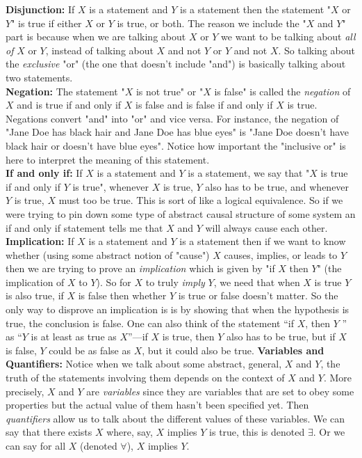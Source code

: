 \documentclass{article}
\theoremstyle{definition}
\theoremstyle{remark}
\begin{document}
\textbf{Disjunction:} If $X$ is a statement and $Y$ is a statement then the statement "$X$ or $Y$" is true if either $X$ or $Y$ is true, or both. The reason we include the "$X$ and $Y$" part is because when we are talking about $X$ or $Y$ we want to be talking about \textit{all of} $X$ or $Y$, instead of talking about $X$ and not $Y$ or $Y$ and not $X$. So talking about the \textit{exclusive} "or" (the one that doesn't include "and") is basically talking about two statements. \\
\textbf{Negation:} The statement "$X$ is not true" or "$X$ is false" is called the \textit{negation} of $X$ and is true if and only if $X$ is false and is false if and only if $X$ is true. Negations convert "and" into "or" and vice versa. For instance, the negation of "Jane Doe has black hair and Jane Doe has blue eyes" is "Jane Doe doesn't have black hair or doesn't have blue eyes". Notice how important the "inclusive or" is here to interpret the meaning of this statement. \\
\textbf{If and only if:} If $X$ is a statement and $Y$ is a statement, we say that "$X$ is true if and only if $Y$ is true", whenever $X$ is true, $Y$ also has to be true, and whenever $Y$ is true, $X$ must too be true. This is sort of like a logical equivalence. So if we were trying to pin down some type of abstract causal structure of some system an if and only if statement tells me that $X$ and $Y$ will always cause each other.\\
\textbf{Implication:} If $X$ is a statement and $Y$ is a statement then if we want to know whether (using some abstract notion of "cause") $X$ causes, implies, or leads to $Y$ then we are trying to prove an \textit{implication} which is given by "if $X$ then $Y$" (the implication of $X$ to $Y$). So for $X$ to truly \textit{imply} $Y$, we need that when $X$ is true $Y$ is also true, if $X$ is false then whether $Y$ is true or false doesn't matter. So the only way to disprove an implication is is by showing that when the hypothesis is true, the conclusion is false. One can also think of the statement “if $X$, then $Y$ ” as “$Y$ is at least as true as $X$”—if $X$ is true, then $Y$ also has to be true, but if $X$ is false, $Y$ could be as false as $X$, but it could also be true. 
\textbf{Variables and Quantifiers:} Notice when we talk about some abstract, general, $X$ and $Y$, the truth of the statements involving them depends on the context of $X$ and $Y$. More precisely, $X$ and $Y$ are \textit{variables} since they are variables that are set to obey some properties but the actual value of them hasn't been specified yet. Then \textit{quantifiers} allow us to talk about the different values of these variables. We can say that there exists $X$ where, say, $X$ implies $Y$ is true, this is denoted \(\exists\). Or we can say for all $X$ (denoted $\forall$), $X$ implies $Y$. 
\end{document}
